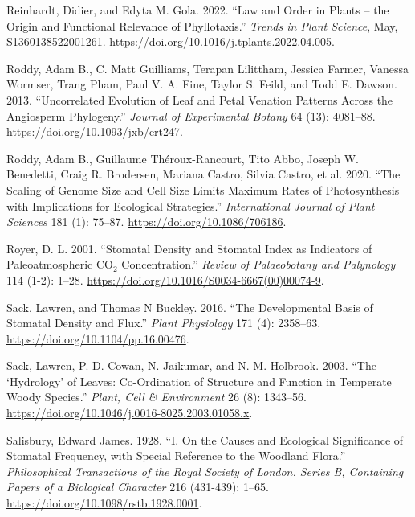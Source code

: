 \documentclass[
  12pt,
]{article}
\newlength{\cslhangindent}
\newlength{\cslentryspacingunit} %
\newenvironment{CSLReferences}[2] %
 {%
  \setlength{\parindent}{0pt}
  \ifodd #1
  \let\oldpar\par
  \def\par{\hangindent=\cslhangindent\oldpar}
  \fi
  \setlength{\parskip}{#2\cslentryspacingunit}
 }%
 {}
\begin{document}
\begin{CSLReferences}{1}{0}
\leavevmode{}%
Reinhardt, Didier, and Edyta M. Gola. 2022. {``Law and Order in Plants -- the Origin and Functional Relevance of Phyllotaxis.''} \emph{Trends in Plant Science}, May, S1360138522001261. \url{https://doi.org/10.1016/j.tplants.2022.04.005}.

\leavevmode{}%
Roddy, Adam B., C. Matt Guilliams, Terapan Lilittham, Jessica Farmer, Vanessa Wormser, Trang Pham, Paul V. A. Fine, Taylor S. Feild, and Todd E. Dawson. 2013. {``Uncorrelated Evolution of Leaf and Petal Venation Patterns Across the Angiosperm Phylogeny.''} \emph{Journal of Experimental Botany} 64 (13): 4081--88. \url{https://doi.org/10.1093/jxb/ert247}.

\leavevmode{}%
Roddy, Adam B., Guillaume Théroux-Rancourt, Tito Abbo, Joseph W. Benedetti, Craig R. Brodersen, Mariana Castro, Silvia Castro, et al. 2020. {``The {Scaling} of {Genome} {Size} and {Cell} {Size} {Limits} {Maximum} {Rates} of {Photosynthesis} with {Implications} for {Ecological} {Strategies}.''} \emph{International Journal of Plant Sciences} 181 (1): 75--87. \url{https://doi.org/10.1086/706186}.

\leavevmode{}%
Royer, D. L. 2001. {``Stomatal Density and Stomatal Index as Indicators of Paleoatmospheric {CO}\(_{\textrm{2}}\) Concentration.''} \emph{Review of Palaeobotany and Palynology} 114 (1-2): 1--28. \url{https://doi.org/10.1016/S0034-6667(00)00074-9}.

\leavevmode{}%
Sack, Lawren, and Thomas N Buckley. 2016. {``The Developmental Basis of Stomatal Density and Flux.''} \emph{Plant Physiology} 171 (4): 2358--63. \url{https://doi.org/10.1104/pp.16.00476}.

\leavevmode{}%
Sack, Lawren, P. D. Cowan, N. Jaikumar, and N. M. Holbrook. 2003. {``The {`Hydrology'} of Leaves: Co-Ordination of Structure and Function in Temperate Woody Species.''} \emph{Plant, Cell \& Environment} 26 (8): 1343--56. \url{https://doi.org/10.1046/j.0016-8025.2003.01058.x}.

\leavevmode{}%
Salisbury, Edward James. 1928. {``I. {On} the Causes and Ecological Significance of Stomatal Frequency, with Special Reference to the Woodland Flora.''} \emph{Philosophical Transactions of the Royal Society of London. Series B, Containing Papers of a Biological Character} 216 (431-439): 1--65. \url{https://doi.org/10.1098/rstb.1928.0001}.


\end{CSLReferences}
\end{document}
